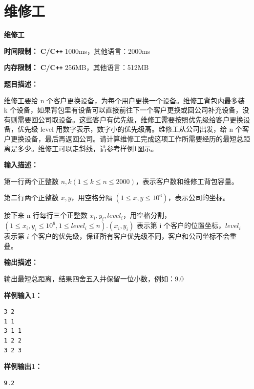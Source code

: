 \documentclass[a4paper]{ctexart}
\begin{document}
\newpage
	
\section{维修工}
	
\begin{center}
	\Large \textbf{维修工}
\end{center}
	
\noindent\textbf{时间限制：} \textbf{C/C\texttt{++}} 1000ms，其他语言：2000ms

\noindent\textbf{内存限制：} \textbf{C/C\texttt{++}} 256MB，其他语言：512MB
	
\vspace{10pt}
	
\noindent\textbf{题目描述：}
	
维修工要给 n 个客户更换设备，为每个用户更换一个设备。维修工背包内最多装 k 个设备，如果背包里有设备可以直接前往下一个客户更换或回公司补充设备，没有则需要回公司取设备。这些客户有优先级，维修工需要按照优先级给客户更换设备，优先级 level 用数字表示，数字小的优先级高。维修工从公司出发，给 n 个客户更换设备，最后再返回公司。请计算维修工完成这项工作所需要经历的最短总距离是多少。维修工可以走斜线，请参考样例1图示。
	
\noindent\textbf{输入描述：}
	
第一行两个正整数 $n, k(1 \leq k \leq n \leq 2000)$，表示客户数和维修工背包容量。
	
第二行两个正整数 $x, y$，用空格分隔 $(1 \leq x, y \leq 10^6)$，表示公司的坐标。
	
接下来 n 行每行三个正整数 $x_i, y_i, level_{i}$，用空格分割，$(1 \leq x_i, y_i \leq 10^6, 1 \leq level_{i} \leq n)$.$(x_i, y_i)$ 表示第 i 个客户的位置坐标，$level_{i}$ 表示第 $i$ 个客户的优先级，保证所有客户优先级不同，客户和公司坐标不会重叠。
	
\noindent\textbf{输出描述：} 
	
输出最短总距离，结果四舍五入并保留一位小数，例如：9.0
	
\noindent\textbf{样例输入1：}
	
\lstset{numbers=none}
\begin{lstlisting}
3 2
1 1
3 1 1
1 2 2
3 2 3
\end{lstlisting}
\lstset{numbers=left}
	
\noindent\textbf{样例输出1：}
\lstset{numbers=none}
\begin{lstlisting}
9.2
\end{lstlisting}
\lstset{numbers=left}
\end{document}
